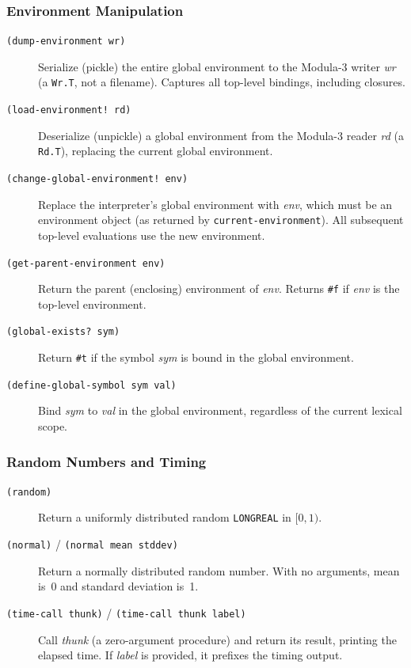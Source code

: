 \documentclass[12pt]{report}
\begin{document}
\subsubsection{Environment Manipulation}

\nopagebreak[4]
\begin{description}
\item[{\tt (dump-environment wr)}]
  Serialize (pickle) the entire global environment to the Modula-3
  writer {\it wr\/} (a {\tt Wr.T}, not a filename).  Captures all
  top-level bindings, including closures.
\item[{\tt (load-environment! rd)}]
  Deserialize (unpickle) a global environment from the Modula-3
  reader {\it rd\/} (a {\tt Rd.T}), replacing the current global
  environment.
\item[{\tt (change-global-environment! env)}]
  Replace the interpreter's global environment with {\it env}, which
  must be an environment object (as returned by
  {\tt current-environment}).  All subsequent top-level evaluations
  use the new environment.
\item[{\tt (get-parent-environment env)}]
  Return the parent (enclosing) environment of {\it env}.  Returns
  {\tt \#f} if {\it env\/} is the top-level environment.
\item[{\tt (global-exists? sym)}]
  Return {\tt \#t} if the symbol {\it sym\/} is bound in the global
  environment.
\item[{\tt (define-global-symbol sym val)}]
  Bind {\it sym\/} to {\it val\/} in the global environment,
  regardless of the current lexical scope.
\end{description}

\subsubsection{Random Numbers and Timing}

\nopagebreak[4]
\begin{description}
\item[{\tt (random)}]
  Return a uniformly distributed random {\tt LONGREAL} in
  $[0, 1)$.
\item[{\tt (normal)} / {\tt (normal mean stddev)}]
  Return a normally distributed random number.  With no arguments,
  mean is~0 and standard deviation is~1.
\item[{\tt (time-call thunk)} / {\tt (time-call thunk label)}]
  Call {\it thunk\/} (a zero-argument procedure) and return
  its result, printing the elapsed time.  If {\it label\/} is
  provided, it prefixes the timing output.
\end{description}
\end{document}
